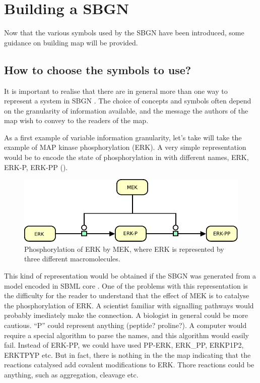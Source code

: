 \section{Building a SBGN \PDm}
\label{chp:build}

Now that the various symbols used by the SBGN \PDl have been introduced, some guidance on building map will be provided. 

\subsection{How to choose the symbols to use?}
\label{sec:choose}

It is important to realise that there are in general more than one way to represent a system in SBGN \PD. The choice of concepts and symbols often depend on the granularity of information available, and the message the authors of the map wish to convey to the readers of the map. 

As a first example of variable information granularity, let's take will take the example of MAP kinase phosphorylation (ERK). A very simple representation would be to encode the state of phosphorylation in  with different names, ERK, ERK-P, ERK-PP ().
 
\begin{figure}[htb]
  \centering
  \includegraphics[scale = 1]{le_images/MAPK-NoVar}
  \caption{Phosphorylation of ERK by MEK, where ERK is represented by three different macromolecules.}
  \label{fig:MAPK-NoVar}
\end{figure}

This kind of representation would be obtained if the SBGN \PDm was generated from a model encoded in SBML core \cite{Hucka:2003}. One of the problems with this representation is the difficulty for the reader to understand that the effect of MEK is to catalyse the phosphorylation of ERK. A scientist familiar with signalling pathways would probably imediately make the connection. A biologist in general could be more cautious. ``P'' could represent anything (peptide? proline?). A computer would require a special algorithm to parse the names, and this algorithm would easily fail. Instead of ERK-PP, we could have used PP-ERK, ERK\_PP, ERKP1P2, ERKTPYP etc. But in fact, there is nothing in the the map  indicating that the reactions catalysed add covalent modifications to ERK. Thore reactions could be anything, such as aggregation, cleavage etc.

